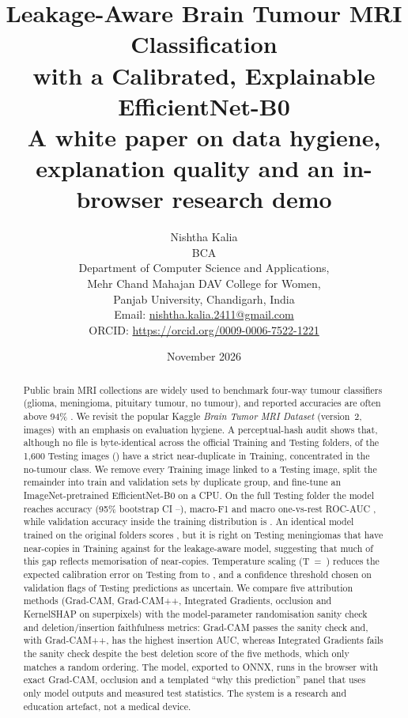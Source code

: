 \documentclass[11pt,a4paper]{article}
\title{\textbf{Leakage-Aware Brain Tumour MRI Classification\\with a Calibrated, Explainable EfficientNet-B0}\\[4pt]\large A white paper on data hygiene, explanation quality and an in-browser research demo}
\author{Nishtha Kalia\\[2pt]
\small BCA\\
\small Department of Computer Science and Applications,\\
\small Mehr Chand Mahajan DAV College for Women,\\
\small Panjab University, Chandigarh, India\\
\small Email: \href{mailto:nishtha.kalia.2411@gmail.com}{nishtha.kalia.2411@gmail.com}\\
\small ORCID: \url{https://orcid.org/0009-0006-7522-1221}}
\date{November 2026}
\begin{document}
\maketitle

\begin{abstract}
\noindent Public brain MRI collections are widely used to benchmark four-way tumour classifiers (glioma, meningioma, pituitary tumour, no tumour), and reported accuracies are often above 94\% \citep{deepak2019,swati2019,badza2020}. We revisit the popular Kaggle \emph{Brain Tumor MRI Dataset} (version~2, \DNImages{} images) with an emphasis on evaluation hygiene. A perceptual-hash audit shows that, although no file is byte-identical across the official Training and Testing folders, \DTestImgWithTrainDupStrict{} of the 1{,}600 Testing images (\StrictDupPct{}) have a strict near-duplicate in Training, concentrated in the no-tumour class. We remove every Training image linked to a Testing image, split the remainder into train and validation sets by duplicate group, and fine-tune an ImageNet-pretrained EfficientNet-B0 on a CPU. On the full Testing folder the model reaches \AccCFull{} accuracy (95\% bootstrap CI \AccLoCFull{}--\AccHiCFull{}), macro-F1 \FOneCFull{} and macro one-vs-rest ROC-AUC \AUCC{}, while validation accuracy inside the training distribution is \ValAccC{}. An identical model trained on the original folders scores \AccNFull{}, but it is right on \LBNMeningiomaDup{} Testing meningiomas that have near-copies in Training against \LBCMeningiomaDup{} for the leakage-aware model, suggesting that much of this gap reflects memorisation of near-copies. Temperature scaling (T~=~\TempC{}) reduces the expected calibration error on Testing from \ECERawC{} to \ECECalC{}, and a confidence threshold chosen on validation flags \UncRateC{} of Testing predictions as uncertain. We compare five attribution methods (Grad-CAM, Grad-CAM++, Integrated Gradients, occlusion and KernelSHAP on superpixels) with the model-parameter randomisation sanity check and deletion/insertion faithfulness metrics: Grad-CAM passes the sanity check and, with Grad-CAM++, has the highest insertion AUC, whereas Integrated Gradients fails the sanity check despite the best deletion score of the five methods, which only matches a random ordering. The model, exported to ONNX, runs in the browser with exact Grad-CAM, occlusion and a templated ``why this prediction'' panel that uses only model outputs and measured test statistics. The system is a research and education artefact, not a medical device.
\end{abstract}
\end{document}
